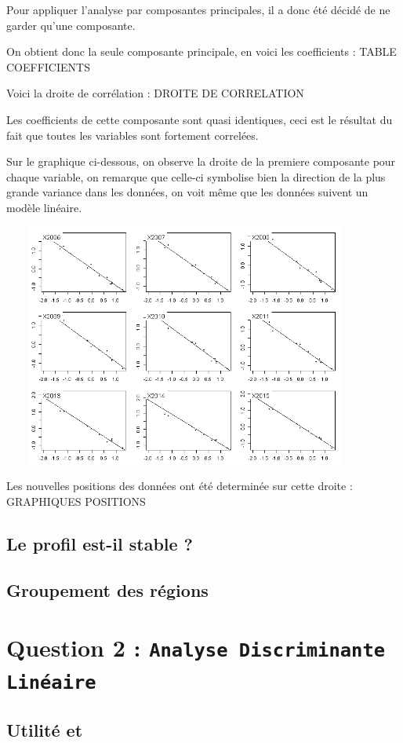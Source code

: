 \documentclass{article}
\begin{document}
Pour appliquer l'analyse par composantes principales, il a donc été décidé de ne garder qu'une composante.

On obtient donc la seule composante principale, en voici les coefficients :
	TABLE COEFFICIENTS

Voici la droite de corrélation : DROITE DE CORRELATION
 
Les coefficients de cette composante sont quasi identiques, ceci est le résultat du fait que toutes les variables sont fortement correlées.

Sur le graphique ci-dessous, on observe la droite de la premiere composante pour chaque variable, on remarque que celle-ci symbolise bien la direction de la plus grande variance dans les données, on voit même que les données suivent un modèle linéaire. 

	\includegraphics[width=12cm,height=8cm]{"score"} 
	
Les nouvelles positions des données ont été determinée sur cette droite :
	GRAPHIQUES POSITIONS
 
\subsection{Le profil est-il stable ?}

\subsection{Groupement des régions}

\section{Question 2 : \texttt{Analyse Discriminante Linéaire}}

\subsection{Utilité et }
\end{document}

